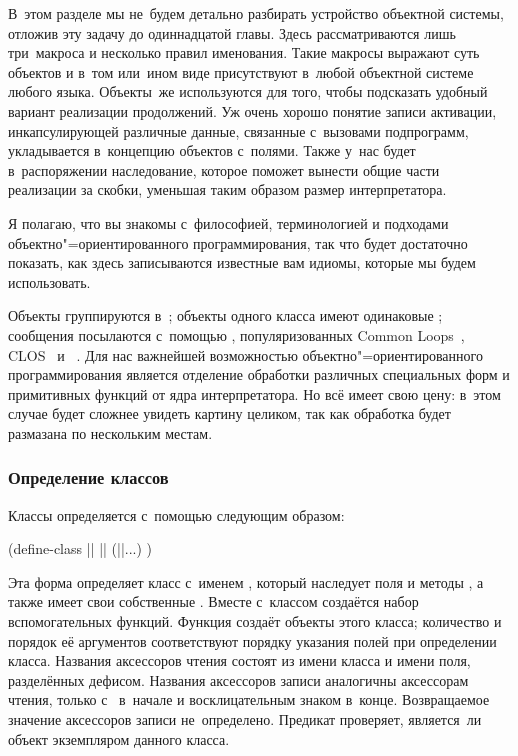 В~этом разделе мы не~будем детально разбирать устройство объектной системы,
отложив эту задачу до одиннадцатой главы. Здесь рассматриваются лишь три~макроса
и несколько правил именования. Такие макросы выражают суть объектов и в~том
или~ином виде присутствуют в~любой объектной системе любого языка. Объекты~же
используются для того, чтобы подсказать удобный вариант реализации продолжений.
Уж очень хорошо понятие записи активации, инкапсулирующей различные данные,
связанные с~вызовами подпрограмм, укладывается в~концепцию объектов с~полями.
Также у~нас будет в~распоряжении наследование, которое поможет вынести общие
части реализации за скобки, уменьшая таким образом размер интерпретатора.

Я полагаю, что вы знакомы с~философией, терминологией и подходами
объектно"=ориентированного программирования, так что будет достаточно показать,
как здесь записываются известные вам идиомы, которые мы будем использовать.

Объекты группируются в~; объекты одного класса имеют одинаковые
; сообщения посылаются с~помощью ,
популяризованных Common Loops~\cite{bkk+86}, CLOS~\cite{bdg+88} и
\TELOS~\cite{pnb93}. Для нас важнейшей возможностью объектно"=ориентированного
программирования является отделение обработки различных специальных форм и
примитивных функций от ядра интерпретатора. Но всё имеет свою цену: в~этом
случае будет сложнее увидеть картину целиком, так как обработка будет размазана
по нескольким местам.


\subsubsection{Определение классов}

Классы определяется с~помощью  следующим образом:

\begin{code:lisp}
(define-class || ||
  (||...) )
\end{code:lisp}

Эта форма определяет класс с~именем , который наследует поля и методы
, а также имеет свои собственные . Вместе с~классом
создаётся набор вспомогательных функций. Функция  создаёт
объекты этого класса; количество и порядок её аргументов соответствуют порядку
указания полей при определении класса. Названия аксессоров чтения состоят из
имени класса и имени поля, разделённых дефисом. Названия аксессоров записи
аналогичны аксессорам чтения, только с~ в~начале и восклицательным
знаком в~конце. Возвращаемое значение аксессоров записи не~определено. Предикат
 проверяет, является~ли объект экземпляром данного класса.

